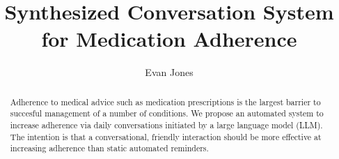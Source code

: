 \documentclass[sigconf]{acmart}
\begin{document}
\title{Synthesized Conversation System for Medication Adherence}


\author{Evan Jones}


\renewcommand{\shortauthors}{Jones}

\begin{abstract}
  Adherence to medical advice such as medication prescriptions is the largest 
  barrier to succesful management of a number of conditions. We propose an 
  automated system to increase adherence via daily conversations initiated by a
  large language model (LLM).  The intention is that a conversational, friendly
  interaction should be more effective at increasing adherence than static 
  automated reminders.

\end{abstract}

\end{document}
